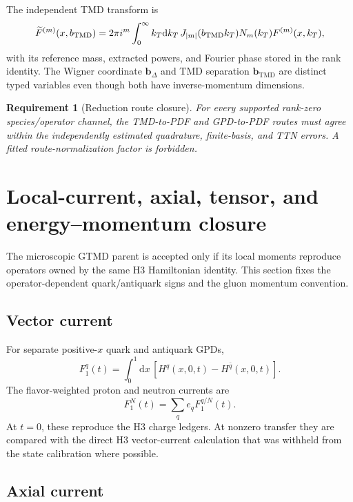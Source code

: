 \documentclass[11pt]{article}
\newtheorem{requirement}[definition]{Requirement}
\newcommand{\bD}{\bm{b}_{\Delta}}
\newcommand{\bM}{\bm{b}_{\mathrm{TMD}}}
\newcommand{\dd}{\mathrm{d}}
\begin{document}
The independent TMD transform is
\begin{equation}
 \widetilde F^{(m)}(x,b_{\rm TMD})
 =2\pi i^m
 \int_0^\infty k_T\dd k_T\,
 J_{|m|}(b_{\rm TMD}k_T)
 N_m(k_T)F^{(m)}(x,k_T),
 \label{eq:h4-rank-bessel}
\end{equation}
with its reference mass, extracted powers, and Fourier phase stored in the
rank identity.  The Wigner coordinate \(\bD\) and TMD separation \(\bM\) are
distinct typed variables even though both have inverse-momentum dimensions.

\begin{requirement}[Reduction route closure]
\label{req:reduction-route-closure}
For every supported rank-zero species/operator channel, the TMD-to-PDF and
GPD-to-PDF routes must agree within the independently estimated quadrature,
finite-basis, and TTN errors.  A fitted route-normalization factor is
forbidden.
\end{requirement}

\section{Local-current, axial, tensor, and energy--momentum closure}
\label{sec:local-moments}

The microscopic GTMD parent is accepted only if its local moments reproduce
operators owned by the same H3 Hamiltonian identity.  This section fixes the
operator-dependent quark/antiquark signs and the gluon momentum convention.

\subsection{Vector current}

For separate positive-\(x\) quark and antiquark GPDs,
\begin{equation}
 F_1^q(t)
 =\int_0^1\dd x\,
 \left[H^q(x,0,t)-H^{\bar q}(x,0,t)\right].
 \label{eq:vector-moment}
\end{equation}
The flavor-weighted proton and neutron currents are
\begin{equation}
 F_1^N(t)
 =\sum_q e_q F_1^{q/N}(t).
 \label{eq:nucleon-vector-moment}
\end{equation}
At \(t=0\), these reproduce the H3 charge ledgers.  At nonzero transfer they
are compared with the direct H3 vector-current calculation that was withheld
from the state calibration where possible.

\subsection{Axial current}
\end{document}
